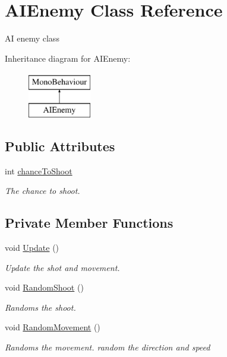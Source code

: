 \hypertarget{class_a_i_enemy}{}\section{A\+I\+Enemy Class Reference}
\label{class_a_i_enemy}


AI enemy class  


Inheritance diagram for A\+I\+Enemy\+:\begin{figure}[H]
\begin{center}
\leavevmode
\includegraphics[height=2.000000cm]{class_a_i_enemy}
\end{center}
\end{figure}
\subsection*{Public Attributes}
\begin{DoxyCompactItemize}
\item 
int \mbox{\hyperlink{class_a_i_enemy_a4514cc12da817389aefe66b88929422a}{chance\+To\+Shoot}}
\begin{DoxyCompactList}\small\item\em The chance to shoot. \end{DoxyCompactList}\end{DoxyCompactItemize}
\subsection*{Private Member Functions}
\begin{DoxyCompactItemize}
\item 
void \mbox{\hyperlink{class_a_i_enemy_a2bc4af5eb1ce9ad274b1fe9bdc4ad07c}{Update}} ()
\begin{DoxyCompactList}\small\item\em Update the shot and movement. \end{DoxyCompactList}\item 
void \mbox{\hyperlink{class_a_i_enemy_a7242a44e9015cb450f194faf94aff25e}{Random\+Shoot}} ()
\begin{DoxyCompactList}\small\item\em Randoms the shoot. \end{DoxyCompactList}\item 
void \mbox{\hyperlink{class_a_i_enemy_a32f92c6e43ffa24333f6787f503b4ca9}{Random\+Movement}} ()
\begin{DoxyCompactList}\small\item\em Randoms the movement. random the direction and speed \end{DoxyCompactList}\end{DoxyCompactItemize}
